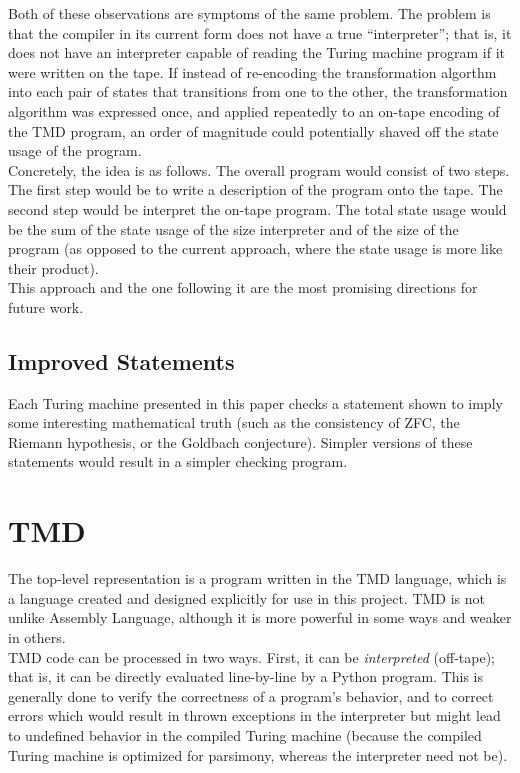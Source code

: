 Both of these observations are symptoms of the same problem. The problem is that the compiler in its current form does not have a true ``interpreter''; that is, it does not have an interpreter capable of reading the Turing machine program if it were written on the tape. If instead of re-encoding the transformation algorthm into each pair of states that transitions from one to the other, the transformation algorithm was expressed once, and applied repeatedly to an on-tape encoding of the TMD program, an order of magnitude could potentially shaved off the state usage of the program. \\

Concretely, the idea is as follows. The overall program would consist of two steps. The first step would be to write a description of the program onto the tape. The second step would be interpret the on-tape program. The total state usage would be the sum of the state usage of the size interpreter and of the size of the program (as opposed to the current approach, where the state usage is more like their product). \\

This approach and the one following it are the most promising directions for future work.

\subsection{Improved Statements}

Each Turing machine presented in this paper checks a statement shown to imply some interesting mathematical truth (such as the consistency of ZFC, the Riemann hypothesis, or the Goldbach conjecture). Simpler versions of these statements would result in a simpler checking program.

\section{TMD}

The top-level representation is a program written in the TMD language, which is a language created and designed explicitly for use in this project. TMD is not unlike Assembly Language, although it is more powerful in some ways and weaker in others. \\

TMD code can be processed in two ways. First, it can be \emph{interpreted} (off-tape); that is, it can be directly evaluated line-by-line by a Python program. This is generally done to verify the correctness of a program's behavior, and to correct errors which would result in thrown exceptions in the interpreter but might lead to undefined behavior in the compiled Turing machine (because the compiled Turing machine is optimized for parsimony, whereas the interpreter need not be). \\

